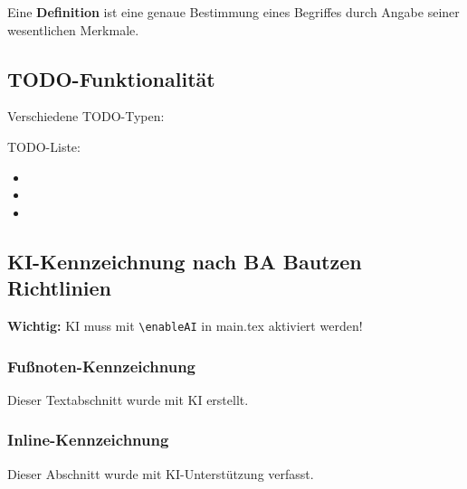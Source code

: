 \documentclass[../main.tex]{subfiles}
\begin{document}
\begin{definition}
Eine \textbf{Definition} ist eine genaue Bestimmung eines Begriffes durch Angabe seiner wesentlichen Merkmale.
\end{definition}


\subsection{TODO-Funktionalität}

Verschiedene TODO-Typen:

TODO-Liste:
\begin{todolist}
 \begin{itemize}
    \item {}
    \item {}
    \item {}
 \end{itemize}
\end{todolist}



\subsection{KI-Kennzeichnung nach BA Bautzen Richtlinien}

\textbf{Wichtig:} KI muss mit \verb|\enableAI| in main.tex aktiviert werden!

\subsubsection{Fußnoten-Kennzeichnung}
Dieser Textabschnitt wurde mit KI erstellt.

\subsubsection{Inline-Kennzeichnung}
Dieser Abschnitt wurde mit KI-Unterstützung verfasst.
\end{document}
